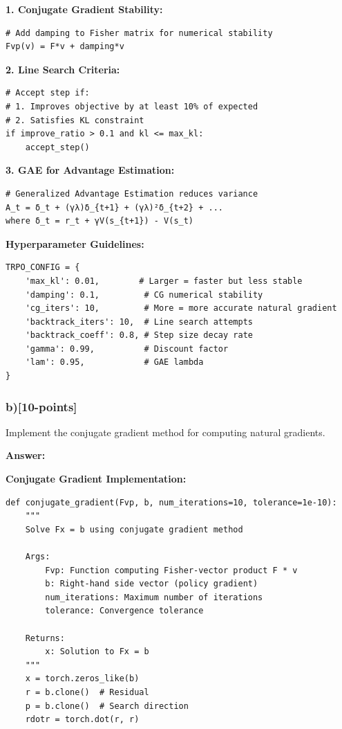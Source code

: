 \documentclass[12pt]{article}
\begin{document}
{{\textbf{1. Conjugate Gradient Stability:}
\begin{verbatim}
# Add damping to Fisher matrix for numerical stability
Fvp(v) = F*v + damping*v
\end{verbatim}

\textbf{2. Line Search Criteria:}
\begin{verbatim}
# Accept step if:
# 1. Improves objective by at least 10% of expected
# 2. Satisfies KL constraint
if improve_ratio > 0.1 and kl <= max_kl:
    accept_step()
\end{verbatim}

\textbf{3. GAE for Advantage Estimation:}
\begin{verbatim}
# Generalized Advantage Estimation reduces variance
A_t = δ_t + (γλ)δ_{t+1} + (γλ)²δ_{t+2} + ...
where δ_t = r_t + γV(s_{t+1}) - V(s_t)
\end{verbatim}

\textbf{Hyperparameter Guidelines:}
\begin{verbatim}
TRPO_CONFIG = {
    'max_kl': 0.01,        # Larger = faster but less stable
    'damping': 0.1,         # CG numerical stability
    'cg_iters': 10,         # More = more accurate natural gradient
    'backtrack_iters': 10,  # Line search attempts
    'backtrack_coeff': 0.8, # Step size decay rate
    'gamma': 0.99,          # Discount factor
    'lam': 0.95,            # GAE lambda
}
\end{verbatim}

\subsubsection{b)[10-points]} Implement the conjugate gradient method for computing natural gradients.

\textbf{Answer:}

\textbf{Conjugate Gradient Implementation:}

\begin{verbatim}
def conjugate_gradient(Fvp, b, num_iterations=10, tolerance=1e-10):
    """
    Solve Fx = b using conjugate gradient method
    
    Args:
        Fvp: Function computing Fisher-vector product F * v
        b: Right-hand side vector (policy gradient)
        num_iterations: Maximum number of iterations
        tolerance: Convergence tolerance
    
    Returns:
        x: Solution to Fx = b
    """
    x = torch.zeros_like(b)
    r = b.clone()  # Residual
    p = b.clone()  # Search direction
    rdotr = torch.dot(r, r)
    

\end{verbatim}}}
\end{document}
